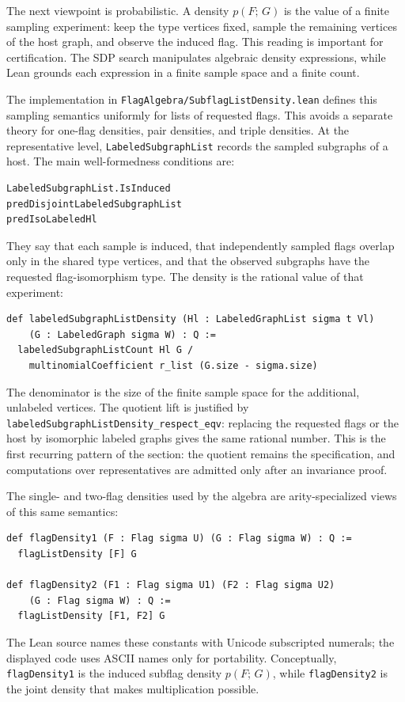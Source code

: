 \documentclass{article}
\newcommand{\den}[2]{p(#1;\,#2)}
\newcommand{\lean}[1]{\texttt{#1}}
\begin{document}
The next viewpoint is probabilistic.  A density $\den{F}{G}$ is the value of a
finite sampling experiment: keep the type vertices fixed, sample the remaining
vertices of the host graph, and observe the induced flag.  This reading is
important for certification.  The SDP search manipulates algebraic density
expressions, while Lean grounds each expression in a finite sample space and a
finite count.

The implementation in \lean{FlagAlgebra/SubflagListDensity.lean} defines this
sampling semantics uniformly for lists of requested flags.  This avoids a
separate theory for one-flag densities, pair densities, and triple densities.
At the representative level, \lean{LabeledSubgraphList} records the sampled
subgraphs of a host.  The main well-formedness conditions are:
\begin{lstlisting}
LabeledSubgraphList.IsInduced
predDisjointLabeledSubgraphList
predIsoLabeledHl
\end{lstlisting}
They say that each sample is induced, that independently sampled flags overlap
only in the shared type vertices, and that the observed subgraphs have the
requested flag-isomorphism type.  The density is the rational value of that
experiment:
\begin{lstlisting}
def labeledSubgraphListDensity (Hl : LabeledGraphList sigma t Vl)
    (G : LabeledGraph sigma W) : Q :=
  labeledSubgraphListCount Hl G /
    multinomialCoefficient r_list (G.size - sigma.size)
\end{lstlisting}
The denominator is the size of the finite sample space for the additional,
unlabeled vertices.  The quotient lift is justified by
\lean{labeledSubgraphListDensity\_respect\_eqv}: replacing the requested flags
or the host by isomorphic labeled graphs gives the same rational number.  This
is the first recurring pattern of the section: the quotient remains the
specification, and computations over representatives are admitted only after an
invariance proof.

The single- and two-flag densities used by the algebra are arity-specialized
views of this same semantics:
\begin{lstlisting}
def flagDensity1 (F : Flag sigma U) (G : Flag sigma W) : Q :=
  flagListDensity [F] G

def flagDensity2 (F1 : Flag sigma U1) (F2 : Flag sigma U2)
    (G : Flag sigma W) : Q :=
  flagListDensity [F1, F2] G
\end{lstlisting}
The Lean source names these constants with Unicode subscripted numerals; the
displayed code uses ASCII names only for portability.  Conceptually,
\lean{flagDensity1} is the induced
subflag density $\den{F}{G}$, while \lean{flagDensity2} is the joint density
that makes multiplication possible.
\end{document}
